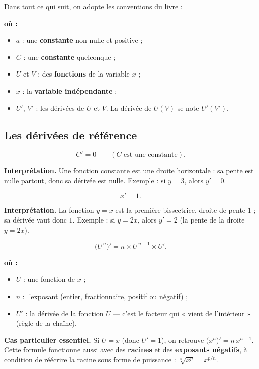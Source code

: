 \documentclass[11pt,a4paper]{article}
\newenvironment{ou}{%
  \par\smallskip\noindent\textbf{où :}\nopagebreak
  \begin{itemize}[leftmargin=1.8em,topsep=2pt,itemsep=1.5pt,parsep=0pt]}%
  {\end{itemize}}
\begin{document}
\medskip
\noindent Dans tout ce qui suit, on adopte les conventions du livre :
\begin{ou}
  \item $a$ : une \textbf{constante} non nulle et positive ;
  \item $C$ : une \textbf{constante} quelconque ;
  \item $U$ et $V$ : des \textbf{fonctions} de la variable $x$ ;
  \item $x$ : la \textbf{variable indépendante} ;
  \item $U'$, $V'$ : les dérivées de $U$ et $V$. La dérivée de $U(V)$ se note $U'(V')$.
\end{ou}

\subsection{Les dérivées de référence}

\begin{formule}
\[
   C'=0 \qquad (C \text{ est une constante}).
\]
\end{formule}
\noindent \textbf{Interprétation.} Une fonction constante est une droite horizontale : sa pente est
nulle partout, donc sa dérivée est nulle. Exemple : si $y=3$, alors $y'=0$.

\begin{formule}
\[
   x'=1.
\]
\end{formule}
\noindent \textbf{Interprétation.} La fonction $y=x$ est la première bissectrice, droite de pente $1$ ;
sa dérivée vaut donc $1$. Exemple : si $y=2x$, alors $y'=2$ (la pente de la droite $y=2x$).

\begin{formule}
\[
   \big(U^{\,n}\big)' = n\times U^{\,n-1}\times U'.
\]
\end{formule}
\begin{ou}
  \item $U$ : une fonction de $x$ ;
  \item $n$ : l'exposant (entier, fractionnaire, positif ou négatif) ;
  \item $U'$ : la dérivée de la fonction $U$ — c'est le facteur qui « vient de l'intérieur »
        (règle de la chaîne).
\end{ou}
\noindent \textbf{Cas particulier essentiel.} Si $U=x$ (donc $U'=1$), on retrouve $\big(x^n\big)'=n\,x^{n-1}$.
Cette formule fonctionne aussi avec des \textbf{racines} et des \textbf{exposants négatifs}, à condition de
réécrire la racine sous forme de puissance : $\sqrt[n]{x^{p}}=x^{p/n}$.
\end{document}
